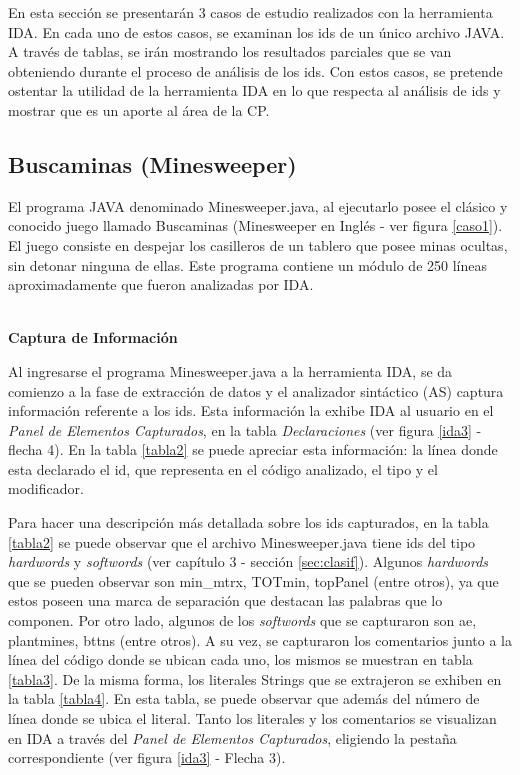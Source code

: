 En esta sección se presentarán 3 casos de estudio realizados con la herramienta IDA. En cada uno de estos casos, se examinan los ids de un único archivo JAVA. A través de tablas, se irán mostrando los resultados parciales que se van obteniendo durante el proceso de análisis de los ids.
Con estos casos, se pretende ostentar la utilidad de la herramienta IDA en lo que respecta al análisis de ids y mostrar que es un aporte al área de la CP.

\subsection{Buscaminas (Minesweeper)}

El programa JAVA denominado Minesweeper.java, al ejecutarlo posee el clásico y conocido juego llamado Buscaminas (Minesweeper en Inglés - ver figura \ref{caso1}). El juego consiste en despejar los casilleros de un tablero que posee minas ocultas, sin detonar ninguna de ellas.
Este programa contiene un módulo de 250 líneas aproximadamente que fueron analizadas por IDA.

\noindent \textbf{\\Captura de Información\\} 

Al ingresarse el programa Minesweeper.java a la herramienta IDA, se da comienzo a la fase de extracción de datos y el analizador sintáctico (AS) captura información referente a los ids. Esta información la exhibe IDA al usuario en el \textit{Panel de Elementos Capturados}, en la tabla \textit{Declaraciones} (ver figura \ref{ida3} - flecha 4). En la tabla \ref{tabla2} se puede apreciar esta información: la línea donde esta declarado el id, que representa en el código analizado, el tipo y el modificador.

Para hacer una descripción más detallada sobre los ids capturados, en la tabla \ref{tabla2} se puede observar que el archivo \mbox{Minesweeper.java}
tiene ids del tipo \textit{hardwords} y \textit{softwords} (ver capítulo 3 - sección \ref{sec:clasif}). Algunos \textit{hardwords} que se pueden observar son \textsf{min\_mtrx}, \textsf{TOTmin}, \textsf{topPanel} (entre otros), ya que estos poseen una marca de separación que destacan las palabras que lo componen. Por otro lado, algunos de los \textit{softwords} que se capturaron son \textsf{ae}, \textsf{plantmines}, \textsf{bttns} (entre otros).
A su vez, se capturaron los comentarios junto a la línea del código donde se ubican cada uno, los mismos se muestran en tabla \ref{tabla3}. De la misma forma, los literales Strings que se extrajeron se exhiben en la tabla \ref{tabla4}. En esta tabla, se puede observar que además del número de línea donde se ubica el literal. 
Tanto los literales y los comentarios se visualizan en IDA a través del \textit{Panel de Elementos Capturados}, eligiendo la pestaña correspondiente (ver figura \ref{ida3} - Flecha 3).

